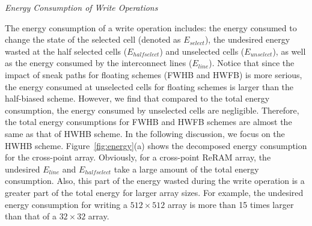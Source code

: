 \vspace{6pt} \emph{Energy Consumption of Write Operations} \vspace{2pt}

The energy consumption of a write operation includes: the energy consumed
to change the state of the selected cell (denoted as $E_{select}$), the
undesired energy wasted at the half selected cells ($E_{halfselect}$) and
unselected cells ($E_{unselect}$), as well as the energy consumed by the
interconnect lines ($E_{line}$). Notice that since the impact of sneak
paths for floating schemes (FWHB and HWFB) is more serious, the energy
consumed at unselected cells for floating schemes is larger than the
half-biased scheme. However, we find that compared to the total energy
consumption, the energy consumed by unselected cells are negligible.
Therefore, the total energy consumptions for FWHB and HWFB schemes are
almost the same as that of HWHB scheme. In the following discussion, we
focus on the HWHB scheme. Figure~\ref{fig:energy}(a) shows the decomposed
energy consumption for the cross-point array. Obviously, for a cross-point ReRAM array, the undesired $E_{line}$ and $E_{halfselect}$ take a large
amount of the total energy consumption. Also, this part of the energy wasted during the write operation is a greater part of the total energy for larger array sizes. For example, the undesired energy consumption for
writing a $512{\times}512$ array is more than 15 times larger than that of a $32{\times}32$ array.

